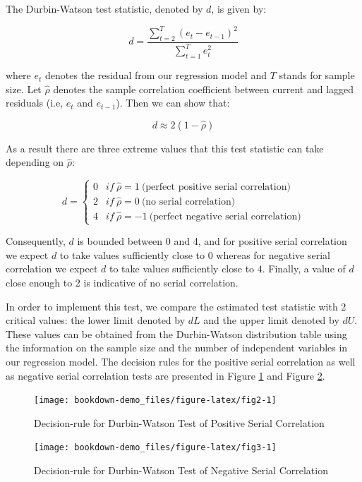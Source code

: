 \documentclass[
]{book}
\theoremstyle{definition}
\theoremstyle{definition}
\theoremstyle{definition}
\theoremstyle{definition}
\theoremstyle{remark}
\begin{document}
The Durbin-Watson test statistic, denoted by \(d\), is given by:

\[d=\frac{\sum_{t=2}^T(e_t - e_{t-1})^2}{\sum_{t=1}^T e_t^2}\]

where \(e_t\) denotes the residual from our regression model and \(T\) stands for sample size. Let \(\widehat{\rho}\) denotes the sample correlation coefficient between current and lagged residuals (i.e, \(e_t\) and \(e_{t-1}\)). Then we can show that:

\[d\approx 2(1-\widehat{\rho})\]

As a result there are three extreme values that this test statistic can take depending on \(\widehat{\rho}\):

\[d=\begin{cases}
0 & if \ \widehat{\rho}=1 \ \text{(perfect positive serial correlation)} \\
2 & if \ \widehat{\rho}=0 \ \text{(no serial correlation)}\\
4 & if \ \widehat{\rho}=-1 \ \text{(perfect negative serial correlation)}
\end{cases}\]

Consequently, \(d\) is bounded between 0 and 4, and for positive serial correlation we expect \(d\) to take values sufficiently close to \(0\) whereas for negative serial correlation we expect \(d\) to take values sufficiently close to \(4\). Finally, a value of \(d\) close enough to \(2\) is indicative of no serial correlation.

In order to implement this test, we compare the estimated test statistic with 2 critical values: the lower limit denoted by \(dL\) and the upper limit denoted by \(dU\). These values can be obtained from the Durbin-Watson distribution table using the information on the sample size and the number of independent variables in our regression model. The decision rules for the positive serial correlation as well as negative serial correlation tests are presented in Figure \ref{fig:fig2} and Figure \ref{fig:fig3}.

\begin{figure}

{\centering \texttt{[image: bookdown-demo\_files/figure-latex/fig2-1]} 

}

\caption{Decision-rule for Durbin-Watson Test of Positive Serial Correlation}\label{fig:fig2}
\end{figure}

\begin{figure}

{\centering \texttt{[image: bookdown-demo\_files/figure-latex/fig3-1]} 

}

\caption{Decision-rule for Durbin-Watson Test of Negative Serial Correlation}\label{fig:fig3}
\end{figure}
\end{document}
